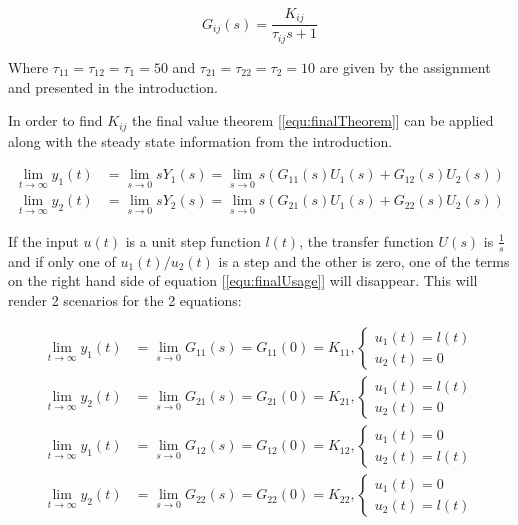 \documentclass[a4paper, titlepage]{article}
\begin{document}
\begin{equation}
G_{ij}(s) = \frac{K_{ij}}{\tau_{ij} s + 1}
\label{equ:firstorderTransFunc}
\end{equation}

Where $\tau_{11} = \tau_{12} = \tau_1 = 50$ and $\tau_{21} = \tau_{22} = \tau_2 = 10$ are given by the assignment and presented in the introduction.

In order to find $K_{ij}$ the final value theorem [\ref{equ:finalTheorem}] can be applied along with the steady state information from the introduction.

\begin{equation}
\begin{split}
\lim_{t \to \infty} y_{1}(t) &= 
\lim_{s \to 0} sY_{1}(s) = 
\lim_{s \to 0} s(G_{11}(s)U_{1}(s) + G_{12}(s)U_{2}(s)) \\
\lim_{t \to \infty} y_{2}(t) &= 
\lim_{s \to 0} sY_{2}(s) = 
\lim_{s \to 0} s(G_{21}(s)U_{1}(s) + G_{22}(s)U_{2}(s))
\end{split}
\label{equ:finalUsage}
\end{equation}

If the input $u(t)$ is a unit step function $l(t)$, the transfer function $U(s)$ is $\frac{1}{s}$ and if only one of $u_1(t)/u_2(t)$ is a step and the other is zero, one of the terms on the right hand side of equation [\ref{equ:finalUsage}] will disappear.
This will render 2 scenarios for the 2 equations:

\begin{equation}
\begin{split}
\lim_{t \to \infty} y_{1}(t) &= 
\lim_{s \to 0} G_{11}(s) = G_{11}(0) = K_{11}, 
\begin{cases}
 u_1(t) = l(t) \\ u_2(t) = 0 
\end{cases} \\
\lim_{t \to \infty} y_{2}(t) &= 
\lim_{s \to 0} G_{21}(s) = G_{21}(0) = K_{21}, 
\begin{cases}
 u_1(t) = l(t) \\ u_2(t) = 0 
\end{cases} \\
\lim_{t \to \infty} y_{1}(t) &= 
\lim_{s \to 0} G_{12}(s) = G_{12}(0) = K_{12}, 
\begin{cases}
 u_1(t) = 0 \\ u_2(t) = l(t) 
\end{cases} \\
\lim_{t \to \infty} y_{2}(t) &= 
\lim_{s \to 0} G_{22}(s) = G_{22}(0) = K_{22}, 
\begin{cases}
 u_1(t) = 0 \\ u_2(t) = l(t) 
\end{cases} \\
\end{split}
\end{equation}
\end{document}
